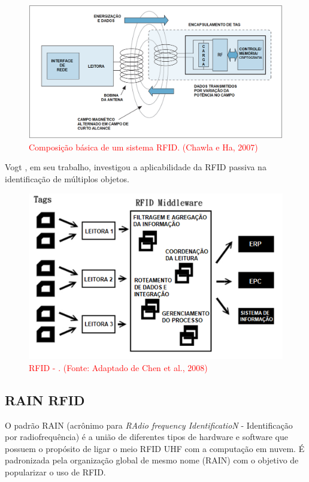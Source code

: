 \begin{figure}[H]
    \centering
    \includegraphics[width=0.8\linewidth]{figs/Fundamentos/RFIDdetails.png}
    \caption{\textcolor{red}{Composição básica de um sistema RFID. (Chawla e Ha, 2007)}}
    \label{fig:DetalhesRFID}
\end{figure}



Vogt \cite{vogt2002multiple}, em seu trabalho, investigou a aplicabilidade da RFID passiva na identificação de múltiplos objetos.

\begin{figure}[H]
    \centering
    \includegraphics[width=0.6\linewidth]{figs/Fundamentos/RFID.png}
    \caption{\textcolor{red}{RFID - . (Fonte: Adaptado de Chen et al., 2008) }}
    \label{fig:AntenaThresholdCoverage}
\end{figure}


\subsection{RAIN RFID}

O padrão RAIN (acrônimo para \textit{RAdio frequency IdentificatioN} - Identificação por radiofrequência) é a união de diferentes tipos de hardware e software que possuem o propósito de ligar o meio RFID UHF com a computação em nuvem. É padronizada pela organização global de mesmo nome (RAIN) com o objetivo de popularizar o uso de RFID. \cite{RAIN}

